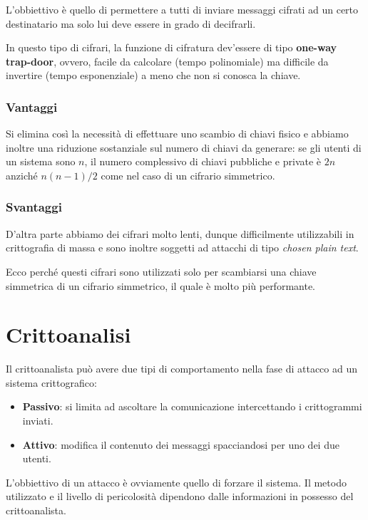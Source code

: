 L'obbiettivo \`e quello di permettere a tutti di inviare messaggi cifrati ad un certo destinatario ma solo lui deve
essere in grado di decifrarli.

In questo tipo di cifrari, la funzione di cifratura dev'essere di tipo \textbf{one-way trap-door}, ovvero, facile da
calcolare (tempo polinomiale) ma difficile da invertire (tempo esponenziale) a meno che non si conosca la chiave.

\subsubsection{Vantaggi}
Si elimina cos\`i la necessit\`a di effettuare uno scambio di chiavi fisico e abbiamo inoltre una riduzione
sostanziale sul numero di chiavi da generare: se gli utenti di un sistema sono $n$, il numero complessivo di chiavi
pubbliche e private \`e $2n$ anzich\'e $n (n-1) / 2$ come nel caso di un cifrario simmetrico.

\subsubsection{Svantaggi}
D'altra parte abbiamo dei cifrari molto lenti, dunque difficilmente utilizzabili in crittografia di massa e sono inoltre
soggetti ad attacchi di tipo \emph{chosen plain text}.

Ecco perch\'e questi cifrari sono utilizzati solo per scambiarsi una chiave simmetrica di un cifrario simmetrico, il
quale \`e molto pi\`u performante.

\section{Crittoanalisi}\label{crittoanalisi}
Il crittoanalista pu\`o avere due tipi di comportamento nella fase di attacco ad un sistema crittografico:
\begin{itemize}
	\item \textbf{Passivo}: si limita ad ascoltare la comunicazione intercettando i crittogrammi inviati.
	\item \textbf{Attivo}: modifica il contenuto dei messaggi spacciandosi per uno dei due utenti.
\end{itemize}
L'obbiettivo di un attacco \`e ovviamente quello di forzare il sistema. Il metodo utilizzato e il livello di
pericolosit\`a dipendono dalle informazioni in possesso del crittoanalista.

